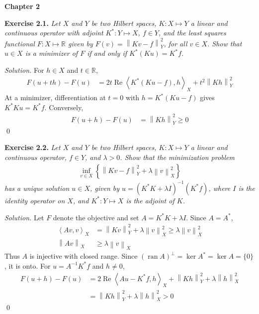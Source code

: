 \documentclass[12pt,letterpaper]{article}
\newcommand{\R}{\mathbb R}
\newcommand{\norm}[1]{\left\lVert #1\right\rVert}
\newcommand{\ip}[2]{\left\langle #1,#2\right\rangle}
\newcommand{\exercise}[1]{%
  \par\bigskip\noindent\textbf{Exercise #1.}\enspace}
\newenvironment{statement}{\itshape\ignorespaces}{\par}
\newcommand{\solution}{\par\medskip\noindent\textit{Solution.}\enspace}
\newcommand{\finish}{\qed\par}
\begin{document}
\begin{center}
\textbf{Chapter 2}
\end{center}

\begin{samepage}
\exercise{2.1}
\begin{statement}
Let $X$ and $Y$ be two Hilbert spaces, $K:X\mapsto Y$ a linear and
continuous operator with adjoint $K^*:Y\mapsto X$, $f\in Y$, and the least
squares functional $F:X\mapsto\R$ given by $F(v)=\norm{Kv-f}_Y^2$, for all
$v\in X$. Show that $u\in X$ is a minimizer of $F$ if and only if
$K^*(Ku)=K^*f$.
\end{statement}
\end{samepage}
\solution
For $h\in X$ and $t\in\R$,
\begin{align*}
 F(u+th)-F(u)
 &=2t\operatorname{Re}\ip{K^*(Ku-f)}{h}_X+t^2\norm{Kh}_Y^2
\end{align*}
At a minimizer, differentiation at $t=0$ with $h=K^*(Ku-f)$ gives
$K^*Ku=K^*f$. Conversely,
\begin{align*}
 F(u+h)-F(u)&=\norm{Kh}_Y^2\geq0
\end{align*}
\finish

\begin{samepage}
\exercise{2.2}
\begin{statement}
Let $X$ and $Y$ be two Hilbert spaces, $K:X\mapsto Y$ a linear and
continuous operator, $f\in Y$, and $\lambda>0$. Show that the minimization
problem
\begin{align*}
 \inf_{v\in X}\left\{\norm{Kv-f}_Y^2+\lambda\norm{v}_X^2\right\}
\end{align*}
has a unique solution $u\in X$, given by
$u=(K^*K+\lambda I)^{-1}(K^*f)$, where $I$ is the identity operator on $X$,
and $K^*:Y\mapsto X$ is the adjoint of $K$.
\end{statement}
\end{samepage}
\solution
Let $F$ denote the objective and set $A=K^*K+\lambda I$. Since
$A=A^*$,
\begin{align*}
 \ip{Av}{v}_X&=\norm{Kv}_Y^2+\lambda\norm{v}_X^2
 \geq\lambda\norm{v}_X^2\\
 \norm{Av}_X&\geq\lambda\norm{v}_X
\end{align*}
Thus $A$ is injective with closed range. Since
$(\operatorname{ran}A)^\perp=\ker A^*=\ker A=\{0\}$, it is onto.
For $u=A^{-1}K^*f$ and $h\ne0$,
\begin{align*}
 F(u+h)-F(u)
 &=2\operatorname{Re}\ip{Au-K^*f}{h}_X
   +\norm{Kh}_Y^2+\lambda\norm{h}_X^2\\
 &=\norm{Kh}_Y^2+\lambda\norm{h}_X^2>0
\end{align*}
\finish
\end{document}
